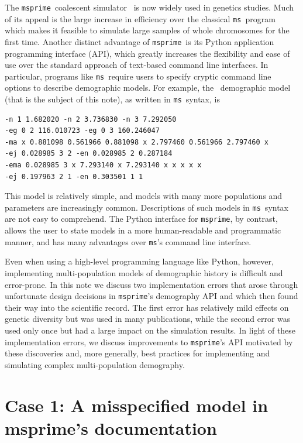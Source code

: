 \documentclass{article}
\newcommand{\msprime}[0]{\texttt{msprime}}
\newcommand{\ms}[0]{\texttt{ms}}
\begin{document}
The \msprime\ coalescent
simulator~\citep{kelleher2016efficient,nelson2020accounting,kelleher2020coalescent}
is now widely used in genetics studies.
Much of its appeal is the large increase in efficiency over the classical
\ms\ program~\citep{hudson2002generating} which makes it feasible to simulate large
samples of whole chromosomes for the first time. Another distinct advantage
of \msprime\ is its Python application programming interface (API), which greatly
increases the flexibility and ease of use over the standard approach of
text-based command line interfaces.
In particular, programs like \ms\ require users to specify cryptic command
line options to describe demographic models.
For example, the~\citet{gutenkunst2009inferring} demographic model
(that is the subject of this note), as written
in \ms\ syntax, is
\begin{verbatim}
-n 1 1.682020 -n 2 3.736830 -n 3 7.292050
-eg 0 2 116.010723 -eg 0 3 160.246047
-ma x 0.881098 0.561966 0.881098 x 2.797460 0.561966 2.797460 x
-ej 0.028985 3 2 -en 0.028985 2 0.287184
-ema 0.028985 3 x 7.293140 x 7.293140 x x x x x
-ej 0.197963 2 1 -en 0.303501 1 1
\end{verbatim}
\noindent This model is relatively simple,
and models with many more populations and parameters are increasingly
common. Descriptions of such models in \ms\ syntax are not easy to comprehend.
The Python interface for \msprime, by contrast, allows the user to
state models in a more human-readable and programmatic manner,
and has many advantages over \ms's command line interface.

Even when using a high-level programming language like Python, however,
implementing multi-population models
of demographic history is difficult and error-prone.
In this note we discuss two implementation errors that arose through
unfortunate design decisions in \msprime's demography API and which then found their way
into the scientific record. The first error has relatively mild effects on genetic diversity but was
used in many publications, while the second error was used only once but had a large impact on the
simulation results.
In light of these implementation errors, we discuss improvements to \msprime's API motivated by these
discoveries and, more generally, best practices for implementing and simulating complex multi-population
demography.

\section*{Case 1: A misspecified model in msprime's documentation}
\end{document}
